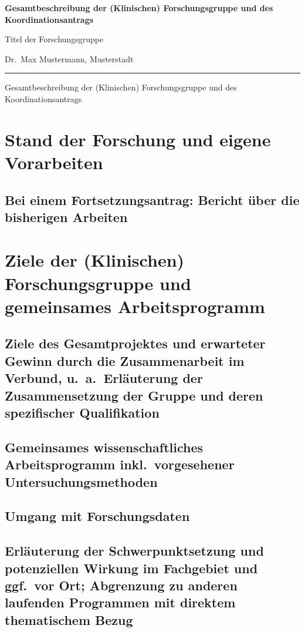 \documentclass[german, 53.02]{proposal}
\newcommand{\spokesperson}{Dr.\ Max Mustermann, Musterstadt}
\newcommand{\project}{Titel der Forschungsgruppe}
\begin{document}
{\raggedright{} \normalsize \bfseries
	Gesamtbeschreibung der (Klinischen) Forschungsgruppe und des Koordinationsantrags \par
    \project{} \par
    \spokesperson{} \par
	\rule{\textwidth}{0.5pt} \par
	Gesamtbeschreibung der (Klinischen) Forschungsgruppe und des Koordinationsantrags
}

\section{Stand der Forschung und eigene Vorarbeiten}

\subsection{Bei einem Fortsetzungsantrag: Bericht über die bisherigen Arbeiten}

\section{Ziele der (Klinischen) Forschungsgruppe und gemeinsames Arbeitsprogramm}

\subsection{Ziele des Gesamtprojektes und erwarteter Gewinn durch die Zusammenarbeit im Verbund, u.\ a.\ Erläuterung der Zusammensetzung der Gruppe und deren spezifischer Qualifikation}

\subsection{Gemeinsames wissenschaftliches Arbeitsprogramm inkl.\ vorgesehener Untersuchungsmethoden}

\subsection{Umgang mit Forschungsdaten}

\subsection{Erläuterung der Schwerpunktsetzung und potenziellen Wirkung im Fachgebiet und ggf.\ vor Ort; Abgrenzung zu anderen laufenden Programmen mit direktem thematischem Bezug}
\end{document}
